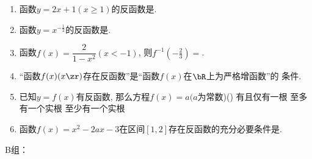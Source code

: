 \begin{enumerate}
\item 函数$y=2x+1(x\geq1)$的反函数是. 

\item 函数$y=x^{-\frac{1}{2}}$的反函数是. 

\item 函数$f(x)=\dfrac{2}{1-x^2}(x<-1)$, 则$f^{-1}(-\frac{2}{3})=$.  

\item ``函数$f(x)(x\zr)$存在反函数''是``函数$f(x)$在$\bR$上为严格增函数''的 条件. 


\item 已知$y=f(x)$有反函数, 那么方程$f(x)=a(a$为常数)\dotfill()
{有且仅有一根}
{至多有一个实根}
{至少有一个实根}


\item 函数$f(x)=x^2-2ax-3$在区间$[1,2]$存在反函数的充分必要条件是\blkda{$a\in(-\infty,1]\cup[2,+\infty)$}.


    
\end{enumerate}

B组：

